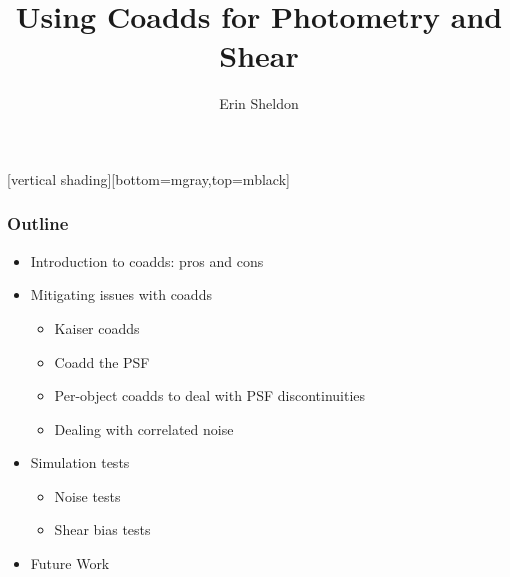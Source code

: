 \documentclass{beamer}
\title{Using Coadds for Photometry and Shear}
\author{Erin Sheldon}
\institute{Brookhaven National Laboratory}
\begin{document}
\frame
{
}
[vertical shading][bottom=mgray,top=mblack]



\frame{\titlepage}




\frame
{
    \frametitle{Outline}

    \begin{itemize}

        \item Introduction to coadds: pros and cons
        \item Mitigating issues with coadds
            \begin{itemize}
                \item Kaiser coadds
                \item Coadd the PSF
                \item Per-object coadds to deal with PSF discontinuities
                \item Dealing with correlated noise
            \end{itemize}
        \item Simulation tests
            \begin{itemize}
                \item Noise tests
                \item Shear bias tests
            \end{itemize}
        \item Future Work

    \end{itemize}

}
\end{document}
